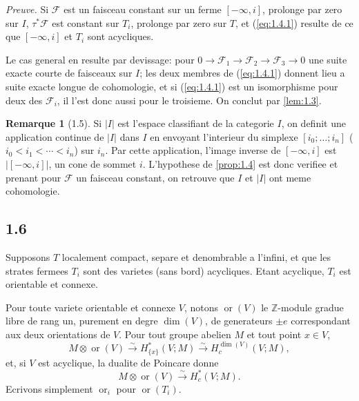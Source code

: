 \documentclass[11pt,a4paper]{article}
\theoremstyle{plain}
\theoremstyle{definition}
\newtheorem{remark}[theorem]{Remarque}
\newcommand{\ori}{\operatorname{or}}
\begin{document}
\noindent\textit{Preuve.} Si $\mathcal{F}$ est un faisceau constant sur un ferme $[-\infty,i]$, prolonge par zero sur $I$, $\tau^*\mathcal{F}$ est constant sur $T_i$, prolonge par zero sur $T$, et (\ref{eq:1.4.1}) resulte de ce que $[-\infty,i]$ et $T_i$ sont acycliques.

Le cas general en resulte par devissage: pour $0 \to \mathcal{F}_1 \to \mathcal{F}_2 \to \mathcal{F}_3 \to 0$ une suite exacte courte de faisceaux sur $I$; les deux membres de (\ref{eq:1.4.1}) donnent lieu a suite exacte longue de cohomologie, et si (\ref{eq:1.4.1}) est un isomorphisme pour deux des $\mathcal{F}_i$, il l'est donc aussi pour le troisieme. On conclut par \ref{lem:1.3}.

\begin{remark}[1.5]\label{rem:1.5}
Si $|I|$ est l'espace classifiant de la categorie $I$, on definit une application continue de $|I|$ dans $I$ en envoyant l'interieur du simplexe $[i_0;\ldots;i_n]$ ($i_0 < i_1 < \cdots < i_n$) sur $i_n$. Par cette application, l'image inverse de $[-\infty,i]$ est $|[{-\infty},i]|$, un cone de sommet $i$. L'hypothese de \ref{prop:1.4} est donc verifiee et prenant pour $\mathcal{F}$ un faisceau constant, on retrouve que $I$ et $|I|$ ont meme cohomologie.
\end{remark}

\subsection{1.6}\label{subsec:1.6}

Supposons $T$ localement compact, separe et denombrable a l'infini, et que les strates fermees $T_i$ sont des varietes (sans bord) acycliques. Etant acyclique, $T_i$ est orientable et connexe.

Pour toute variete orientable et connexe $V$, notons $\ori(V)$ le $\mathbb{Z}$-module gradue libre de rang un, purement en degre $\dim(V)$, de generateurs $\pm e$ correspondant aux deux orientations de $V$. Pour tout groupe abelien $M$ et tout point $x \in V$,
\begin{equation}\label{eq:1.6.1}
M \otimes \ori(V) \xrightarrow{\sim} H^*_{\{x\}}(V;M) \xrightarrow{\sim} H^{\dim(V)}_c(V;M),
\tag{1.6.1}
\end{equation}
et, si $V$ est acyclique, la dualite de Poincare donne
\begin{equation}\label{eq:1.6.2}
M \otimes \ori(V) \xrightarrow{\sim} H^*_c(V;M).
\tag{1.6.2}
\end{equation}
Ecrivons simplement $\ori_i$ pour $\ori(T_i)$.
\end{document}
